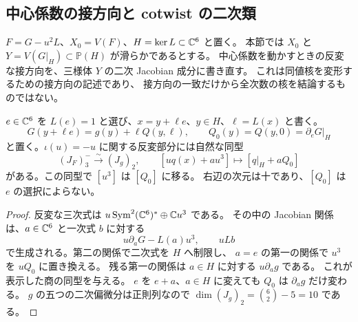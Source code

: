 \subsection{中心係数の接方向と cotwist の二次類}
\label{cmo:subsec:central-geometry}

$F=G-u^2L$、$X_0=V(F)$、$H=\ker L\subset\mathbb C^6$ と置く。
本節では $X_0$ と $Y=V(G|_H)\subset\mathbb P(H)$ が滑らかであるとする。
中心係数を動かすときの反変な接方向を、三様体 $Y$ の二次 Jacobian 成分に書き直す。
これは同値核を変形するための接方向の記述であり、
接方向の一致だけから全次数の核を結論するものではない。

\begin{lemma}[反変な三次類と法方向の二次類]
\label{cmo:lem:odd-normal-quadric}
$e\in\mathbb C^6$ を $L(e)=1$ と選び、$x=y+\ell e$、$y\in H$、$\ell=L(x)$ と書く。
\[
 G(y+\ell e)=g(y)+\ell Q(y,\ell),\qquad
 Q_0(y)=Q(y,0)=\partial_eG|_H
\]
と置く。$\iota(u)=-u$ に関する反変部分には自然な同型
\begin{equation}\label{cmo:eq:odd-jacobian-normal-quadric}
 (J_F)_3^-\xrightarrow{\sim}(J_g)_2,\qquad
 [u q(x)+a u^3]\longmapsto[q|_H+aQ_0]
\end{equation}
がある。この同型で $[u^3]$ は $[Q_0]$ に移る。
右辺の次元は十であり、$[Q_0]$ は $e$ の選択によらない。
\end{lemma}
\begin{proof}
反変な三次式は $u\operatorname{Sym}^2(\mathbb C^6)^*\oplus\mathbb C u^3$ である。
その中の Jacobian 関係は、$a\in\mathbb C^6$ と一次式 $b$ に対する
\[
 u\partial_aG-L(a)u^3,\qquad uLb
\]
で生成される。第二の関係で二次式を $H$ へ制限し、
$a=e$ の第一の関係で $u^3$ を $uQ_0$ に置き換える。
残る第一の関係は $a\in H$ に対する $u\partial_ag$ である。
これが表示した商の同型を与える。
$e$ を $e+a$、$a\in H$ に変えても $Q_0$ は $\partial_ag$ だけ変わる。
$g$ の五つの二次偏微分は正則列なので
$\dim(J_g)_2=\binom62-5=10$ である。
\end{proof}


